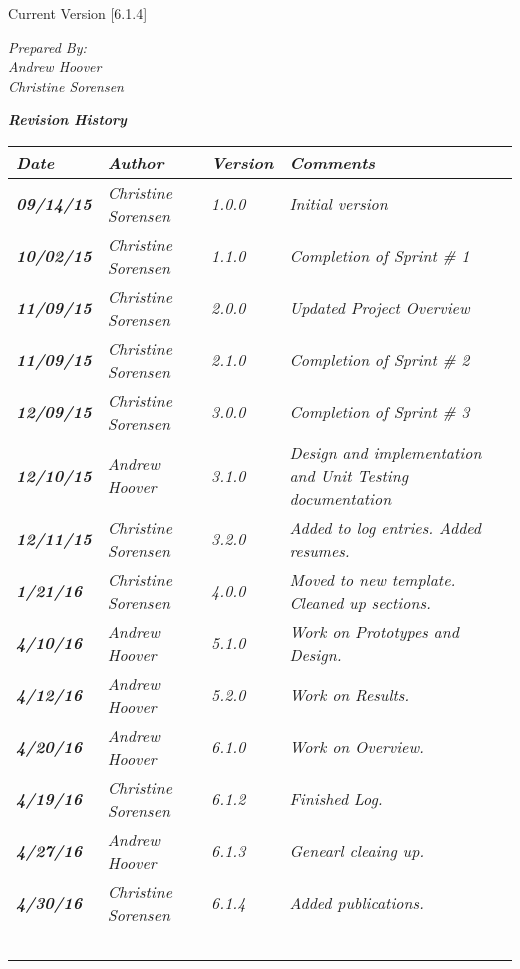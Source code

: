 


Current Version [6.1.4]
\vspace*{5mm}

{\color{SDColor5}
\noindent
\textit{Prepared By:}\\
\textit{Andrew Hoover}\\
\textit{Christine Sorensen}
}

\vfill
\noindent
{\color{SDColor3} \textit{\textbf{Revision History}}}\\
\begin{tabular}{|>{\raggedright}p{1.5cm}|>{\raggedright}p{3cm}|>{\raggedright}p{1.5cm}|>{\raggedright}p{9cm}|}
\hline
\textit{\textbf{Date}} &  \textit{\textbf{Author}} & \textit{\textbf{Version}} & \textit{\textbf{Comments}}\tabularnewline
\hline

\textit{\textbf{09/14/15}} & \textit{Christine Sorensen} & \textit{1.0.0} & \textit{Initial version}\tabularnewline
\hline
\textit{\textbf{10/02/15}} & \textit{Christine Sorensen} & \textit{1.1.0} & \textit{Completion of Sprint \# 1}\tabularnewline
\hline
\textit{\textbf{11/09/15}} & \textit{Christine Sorensen} & \textit{2.0.0} & \textit{Updated Project Overview}\tabularnewline
\hline
\textit{\textbf{11/09/15}} & \textit{Christine Sorensen} & \textit{2.1.0} & \textit{Completion of Sprint \# 2}\tabularnewline
\hline
\textit{\textbf{12/09/15}} & \textit{Christine Sorensen} & \textit{3.0.0} & \textit{Completion of Sprint \# 3}\tabularnewline
\hline
\textit{\textbf{12/10/15}} & \textit{Andrew Hoover} & \textit{3.1.0} & \textit{Design and implementation and Unit Testing documentation}\tabularnewline
\hline
\textit{\textbf{12/11/15}} & \textit{Christine Sorensen} & \textit{3.2.0} & \textit{Added to log entries. Added resumes.}\tabularnewline
\hline
\textit{\textbf{1/21/16}} & \textit{Christine Sorensen} & \textit{4.0.0} & \textit{Moved to new template. Cleaned up sections.}\tabularnewline
\hline
\textit{\textbf{4/10/16}} & \textit{Andrew Hoover} & \textit{5.1.0} & \textit{Work on Prototypes and Design.}\tabularnewline
\hline
\textit{\textbf{4/12/16}} & \textit{Andrew Hoover} & \textit{5.2.0} & \textit{Work on Results.}\tabularnewline
\hline
\textit{\textbf{4/20/16}} & \textit{Andrew Hoover} & \textit{6.1.0} & \textit{Work on Overview.}\tabularnewline
\hline
\textit{\textbf{4/19/16}} & \textit{Christine Sorensen} & \textit{6.1.2} & \textit{Finished Log.}\tabularnewline
\hline
\textit{\textbf{4/27/16}} & \textit{Andrew Hoover} & \textit{6.1.3} & \textit{Genearl cleaing up.}\tabularnewline
\hline
\textit{\textbf{4/30/16}} & \textit{Christine Sorensen} & \textit{6.1.4} & \textit{Added publications.}\tabularnewline



\hline
 &  &  & \tabularnewline
 \hline
 &  &  & \tabularnewline
\hline
 &  &  & \tabularnewline
\hline
 &  &  & \tabularnewline
\hline
 &  &  & \tabularnewline
\hline
\end{tabular}
\vfill

